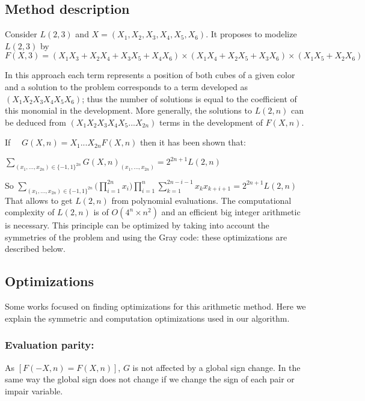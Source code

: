 \subsection{Method description}
Consider $L(2,3)$ and $X=(X_1,X_2,X_3,X_4,X_5,X_6)$. 
It proposes to modelize $L(2,3)$ by 
$F(X,3) = (X_1X_3+X_2X_4+X_3X_5+X_4X_6)\times (X_1X_4+X_2X_5+X_3X_6)\times (X_1X_5+X_2X_6) $

In this approach each term represents a position of both cubes of a given color and a solution to the problem corresponds to a term developed as $(X_1X_2X_3X_4X_5X_6)$; thus the number of solutions is equal to the coefficient of this monomial in the development. More generally, the solutions to $L(2,n)$ can be deduced from $(X_1X_2X_3X_4X_5...X_{2n})$ terms in the development of $F(X,n)$.

If \ \ $G(X,n) = X_1 ... X_{2n} F(X,n)$ then it has been shown that: 


$\sum\limits_{(x_1,...,x_{2n}) \in \{-1,1\}^{2n}} G(X,n)_{(x_1,...,x_{2n})} =  2^{2n+1}L(2,n)$

So \hspace*{2cm}
$\sum\limits_{(x_1,...,x_{2n}) \in \{-1,1\}^{2n}} \big( \prod\limits_{i=1}^{2n} x_i \big) \prod\limits_{i=1}^{n} \sum\limits_{k=1}^{2n-i-1} x_kx_{k+i+1} = 2^{2n+1} L(2,n)$
\\

\noindent That allows to get $L(2,n)$ from polynomial evaluations.
The computational complexity of $L(2,n)$ is of $O(4^n\times n^2)$ and an efficient big integer arithmetic is necessary. This principle can be optimized by taking into account the symmetries of the problem and using the Gray code: these optimizations are described below.

\subsection{Optimizations}
Some works focused on finding optimizations for this arithmetic method\cite{CReSTIC-1154}. Here we explain the symmetric and computation optimizations used in our algorithm.

\subsubsection{Evaluation parity: }
As $[F(-X,n) = F(X,n)]$, $G$ is not affected by a global sign change. 
In the same way the global sign does not change if we change the sign of each pair or impair variable.


